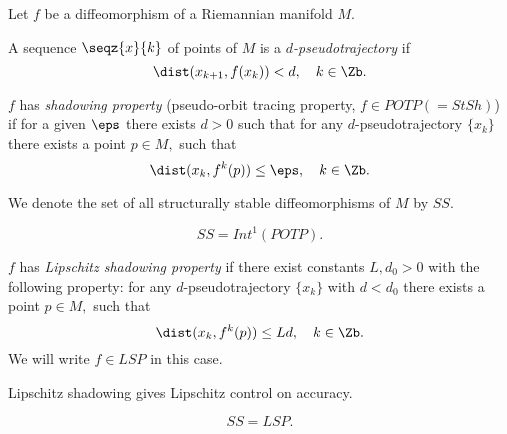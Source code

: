 Let $f$ be a diffeomorphism of a Riemannian manifold $M.$
%
\begin{deff}
A sequence $\seqz{x}{k}$ of points of $M$ is a \textit{$d$-pseudotrajectory} if
\begin{equation*}
\dist(x_{k+1},f(x_k))<d,\quad k\in\Zb.
\end{equation*}
\end{deff}
%
\begin{deff}
$f$ has \textit{shadowing property} (pseudo-orbit tracing property, $f\in POTP (=StSh)$) if for a given $\eps$ there exists $d > 0$ such that for any $d$-pseudotrajectory $\{x_k\}$ there exists a point $p\in M,$ such that
$$
\dist(x_{k},f^k(p)) \leq  \eps,\quad k\in\Zb.
$$
\end{deff}
%
We denote the set of all structurally stable diffeomorphisms of $M$ by $SS.$
\begin{theorem}[Sakai, 1994]
$$SS=Int^1 (POTP).$$
\end{theorem}
%
\begin{deff}
$f$ has \textit{Lipschitz shadowing property} if there exist constants
$L, d_0 > 0$ with the following property: for any $d$-pseudotrajectory $\{x_k\}$ with $d < d_0$ there exists a point $p\in M,$ such that
$$
\dist(x_{k},f^k(p)) \leq  Ld,\quad k\in\Zb.
$$
We will write $f\in LSP$ in this case.
\end{deff}
%
Lipschitz shadowing gives Lipschitz control on accuracy.
%
\begin{theorem} \label{thm:mainlip}
$$SS=LSP.$$
\end{theorem}